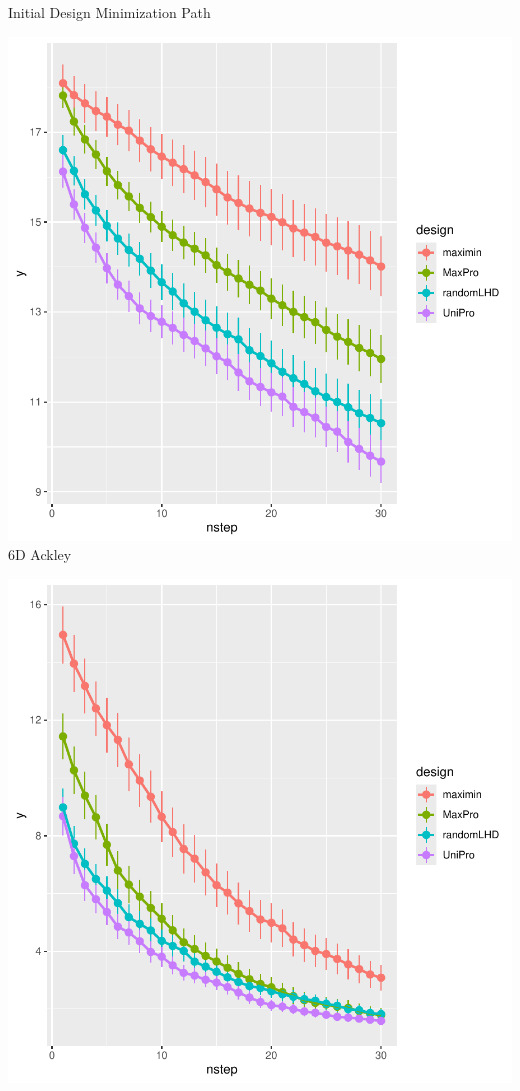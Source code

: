 \documentclass{beamer}
\begin{document}
\begin{frame}{Initial Design Minimization Path}
\begin{minipage}{0.32\textwidth}
\centering
\includegraphics[width=\textwidth]{../chapters/EGO/pdfs/ackley6_lineplot1}
\small{6D Ackley}
\end{minipage}
\hfill
\begin{minipage}{0.32\textwidth}
\centering
\includegraphics[width=\textwidth]{../chapters/EGO/pdfs/levy6_lineplot1}

\end{minipage}
\end{frame}
\end{document}
